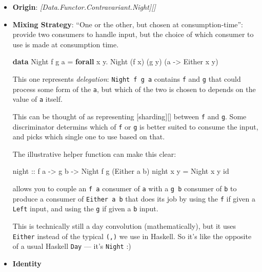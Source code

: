 \documentclass[]{article}
\newenvironment{Shaded}{}{}
\newcommand{\DataTypeTok}[1]{\textcolor[rgb]{0.56,0.13,0.00}{#1}}
\newcommand{\FunctionTok}[1]{\textcolor[rgb]{0.02,0.16,0.49}{#1}}
\newcommand{\KeywordTok}[1]{\textcolor[rgb]{0.00,0.44,0.13}{\textbf{#1}}}
\newcommand{\NormalTok}[1]{#1}
\newcommand{\OperatorTok}[1]{\textcolor[rgb]{0.40,0.40,0.40}{#1}}
\newcommand{\OtherTok}[1]{\textcolor[rgb]{0.00,0.44,0.13}{#1}}
\begin{document}
\begin{itemize}
\item
  \textbf{Origin}: \emph{{[}Data.Functor.Contravariant.Night{]}{[}{]}}
\item
  \textbf{Mixing Strategy}: ``One or the other, but chosen at
  consumption-time'': provide two consumers to handle input, but the choice of
  which consumer to use is made at consumption time.

\begin{Shaded}
\begin{Highlighting}[]
\KeywordTok{data} \DataTypeTok{Night}\NormalTok{ f g a }\OtherTok{=} \KeywordTok{forall}\NormalTok{ x y}\OperatorTok{.} \DataTypeTok{Night}\NormalTok{ (f x) (g y) (a }\OtherTok{{-}>} \DataTypeTok{Either}\NormalTok{ x y)}
\end{Highlighting}
\end{Shaded}

  This one represents \emph{delegation}: \texttt{Night\ f\ g\ a} contains
  \texttt{f} and \texttt{g} that could process some form of the \texttt{a}, but
  which of the two is chosen to depends on the value of \texttt{a} itself.

  This can be thought of as representing {[}sharding{]}{[}{]} between \texttt{f}
  and \texttt{g}. Some discriminator determins which of \texttt{f} or \texttt{g}
  is better suited to consume the input, and picks which single one to use based
  on that.

  The illustrative helper function can make this clear:

\begin{Shaded}
\begin{Highlighting}[]
\OtherTok{night ::}\NormalTok{ f a }\OtherTok{{-}>}\NormalTok{ g b }\OtherTok{{-}>} \DataTypeTok{Night}\NormalTok{ f g (}\DataTypeTok{Either}\NormalTok{ a b)}
\NormalTok{night x y }\OtherTok{=} \DataTypeTok{Night}\NormalTok{ x y }\FunctionTok{id}
\end{Highlighting}
\end{Shaded}

  allows you to couple an \texttt{f\ a} consumer of \texttt{a} with a
  \texttt{g\ b} consumer of \texttt{b} to produce a consumer of
  \texttt{Either\ a\ b} that does its job by using the \texttt{f} if given a
  \texttt{Left} input, and using the \texttt{g} if given a \texttt{b} input.

  This is technically still a day convolution (mathematically), but it uses
  \texttt{Either} instead of the typical \texttt{(,)} we use in Haskell. So it's
  like the opposite of a usual Haskell \texttt{Day} --- it's \texttt{Night} :)
\item
  \textbf{Identity}


\end{itemize}
\end{document}
